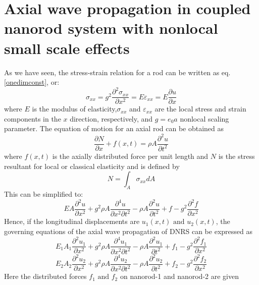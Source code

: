 \section{Axial wave propagation in coupled nanorod system with nonlocal small scale effects}
As we have seen, the stress-strain relation for a rod can be written as eq.\eqref{onedimconst}, or:\\
\begin{equation}
\sigma_{xx} = g^2 \frac{\partial^2 \sigma_{xx}}{\partial x^2} = E \varepsilon_{xx} = E \frac{\partial u}{\partial x}
\end{equation}
where $E$ is the modulus of elasticity,$\sigma_{xx}$ and $\varepsilon_{xx}$ are the local stress
and strain components in the $x$ direction, respectively, and $g=e_0 a$ nonlocal scaling parameter. The equation
of motion for an axial rod can be obtained as\\
\begin{equation}
\dfrac{\partial N}{\partial x} +f(x,t) =\rho A \dfrac{\partial^2 u}{\partial t^2}
\end{equation}
where $f(x, t)$ is the axially distributed force per unit length and $N$ is
the stress resultant for local or classical elasticity and is defined by\\
\[N = \int_A \sigma_{xx} dA\]
This can be simplified to:\\
\begin{equation}
EA \dfrac{\partial^2 u}{\partial x^2} + g^2 \rho A \dfrac{\partial^4 u}{\partial x^2 \partial t^2} - \rho A \dfrac{\partial^2 u}{\partial t^2} + f - g^2 \dfrac{\partial^2 f}{\partial x^2}
\end{equation}
Hence, if the longitudinal displacements are $u_1(x,t)\text{ and } u_2(x,t)$, the governing equations of the axial wave propagation of DNRS
can be expressed as\\
\begin{equation}
E_1A_1 \dfrac{\partial^2 u_1}{\partial x^2} + g^2 \rho A \dfrac{\partial^4 u_1}{\partial x^2 \partial t^2} - \rho A \dfrac{\partial^2 u_1}{\partial t^2} + f_1 - g^2 \dfrac{\partial^2 f_1}{\partial x^2}
\end{equation}
\begin{equation}
E_2A_2 \dfrac{\partial^2 u_2}{\partial x^2} + g^2 \rho A \dfrac{\partial^4 u_2}{\partial x^2 \partial t^2} - \rho A \dfrac{\partial^2 u_2}{\partial t^2} + f_2 - g^2 \dfrac{\partial^2 f_2}{\partial x^2}
\end{equation}
Here the distributed forces $f_1\text{ and } f_2$ on nanorod-1 and nanorod-2 are given
